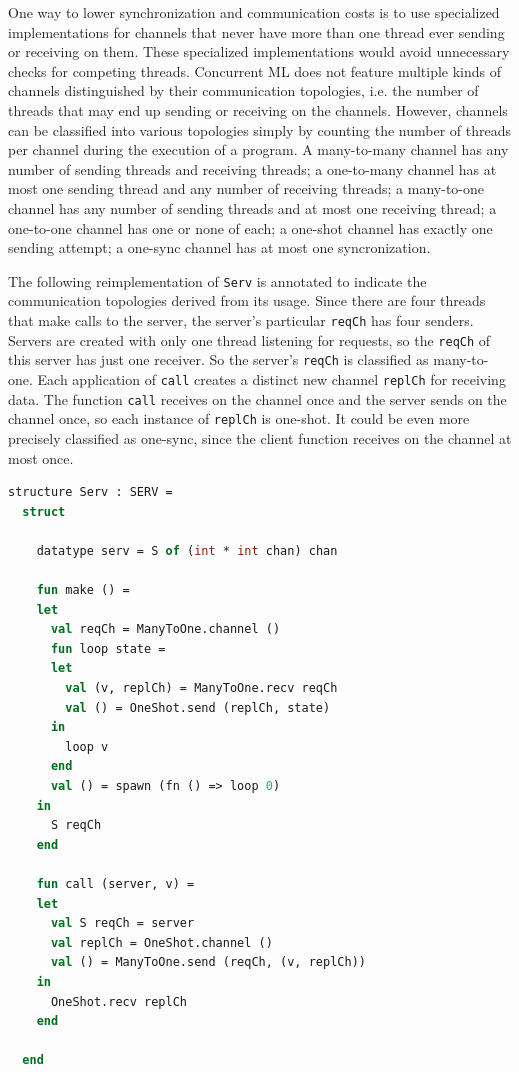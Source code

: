 \documentclass[letterpaper, 11pt]{report}
\begin{document}
One way to lower synchronization and communication costs is to use specialized implementations
for channels that never have more than one thread ever sending or receiving on them. These
specialized implementations would avoid unnecessary checks for competing threads.
Concurrent ML does not feature multiple kinds of channels distinguished by their communication
topologies, i.e. the number of threads that may end up sending or receiving on the channels.
However, channels can be classified into various topologies simply by counting the number of
threads per channel during the execution of a program. A many-to-many channel has any number
of sending threads and receiving threads;
a one-to-many channel has at most one sending thread and
any number of receiving threads;
a many-to-one channel has any number of sending threads and at most one receiving thread;
a one-to-one channel has one or none of each;
a one-shot channel has exactly one sending attempt;
a one-sync channel has at most one syncronization.

The following reimplementation of \lstinline{Serv} is annotated to indicate the communication topologies
derived from its usage. Since there are four threads that make calls to the server, the
server's particular \lstinline{reqCh} has four senders. Servers are created with only one
thread listening for requests, so the \lstinline{reqCh} of this server has just one receiver.
So the server's \lstinline{reqCh} is classified as many-to-one.
Each application of \lstinline{call} creates a distinct
new channel \lstinline{replCh} for receiving data. The function \lstinline{call} receives on the channel
once and the server sends on the channel once, so each instance of \lstinline{replCh} is
one-shot. It could be even more precisely classified as one-sync, since the client function receives on
the channel at most once.

\begin{lstlisting}[language=ML, mathescape]
  structure Serv : SERV =
  struct 

    datatype serv = S of (int * int chan) chan 

    fun make () =
    let 
      val reqCh = ManyToOne.channel ()
      fun loop state =
      let
        val (v, replCh) = ManyToOne.recv reqCh
        val () = OneShot.send (replCh, state)
      in
        loop v
      end
      val () = spawn (fn () => loop 0)
    in
      S reqCh
    end 

    fun call (server, v) =
    let 
      val S reqCh = server
      val replCh = OneShot.channel ()
      val () = ManyToOne.send (reqCh, (v, replCh))
    in
      OneShot.recv replCh
    end

  end
\end{lstlisting}
\end{document}
